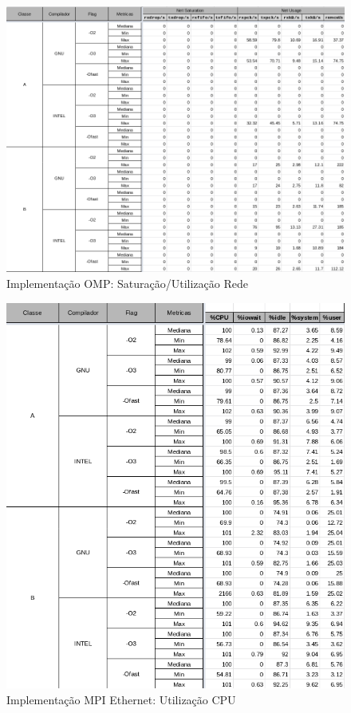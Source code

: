 \documentclass{article}
\begin{document}
\begin{appendices}
\begin{figure}[H]
    \centering
    \includegraphics[width=12cm]{Pictures/FT_r641_OMP_NET.png}
    \caption{Implementação OMP: Saturação/Utilização Rede}
    \label{figure:FT_r641_OMP_NET}
\end{figure}



\begin{figure}[H]
    \centering
    \includegraphics[width=12cm]{Pictures/FT_r641_MPIE_CPU.png}
    \caption{Implementação MPI Ethernet: Utilização CPU}
    \label{figure:FT_r641_MPIE_CPU}
\end{figure}


\end{appendices}
\end{document}
